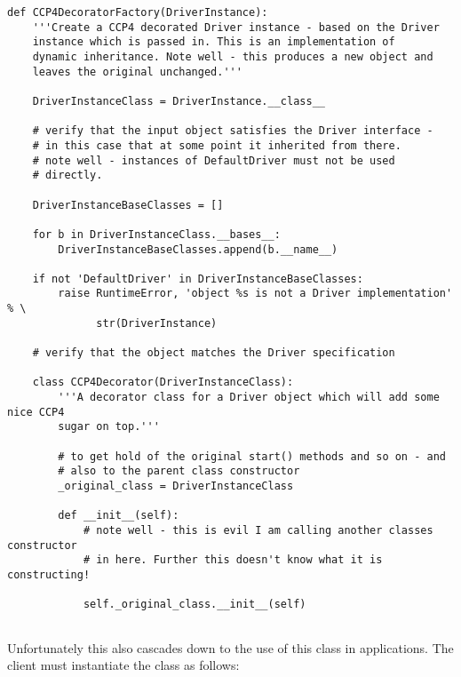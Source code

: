 \documentclass[a4paper, 11pt]{article}
\begin{document}
{
\tiny
\begin{verbatim}
def CCP4DecoratorFactory(DriverInstance):
    '''Create a CCP4 decorated Driver instance - based on the Driver
    instance which is passed in. This is an implementation of
    dynamic inheritance. Note well - this produces a new object and
    leaves the original unchanged.'''

    DriverInstanceClass = DriverInstance.__class__

    # verify that the input object satisfies the Driver interface -
    # in this case that at some point it inherited from there.
    # note well - instances of DefaultDriver must not be used
    # directly.

    DriverInstanceBaseClasses = []

    for b in DriverInstanceClass.__bases__:
        DriverInstanceBaseClasses.append(b.__name__)

    if not 'DefaultDriver' in DriverInstanceBaseClasses:
        raise RuntimeError, 'object %s is not a Driver implementation' % \
              str(DriverInstance)

    # verify that the object matches the Driver specification

    class CCP4Decorator(DriverInstanceClass):
        '''A decorator class for a Driver object which will add some nice CCP4
        sugar on top.'''

        # to get hold of the original start() methods and so on - and
        # also to the parent class constructor
        _original_class = DriverInstanceClass

        def __init__(self):
            # note well - this is evil I am calling another classes constructor
            # in here. Further this doesn't know what it is constructing!
            
            self._original_class.__init__(self)
         
\end{verbatim}
}

\noindent
Unfortunately this also cascades down to the use of this class in 
applications. The client must instantiate the class as follows:
\end{document}
